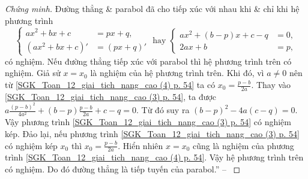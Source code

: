\documentclass[oneside]{book}
\numberwithin{equation}{section}
\begin{document}
\begin{proof}[Chứng minh]
	Đường thẳng \& parabol đã cho tiếp xúc với nhau khi \& chỉ khi hệ phương trình
	\begin{equation}
		\label{SGK_Toan_12_giai_tich_nang_cao (4) p. 54}
		\left\{\begin{split}
			ax^2 + bx + c &= px + q,\\
			(ax^2 + bx + c)' &= (px + q)'
		\end{split}\right.\mbox{ hay }\left\{\begin{split}
			ax^2 + (b - p)x + c - q &= 0,\\
			2ax + b & = p,
		\end{split}\right.
	\end{equation}
	có nghiệm. Nếu đường thẳng tiếp xúc với parabol thì hệ phương trình trên có nghiệm. Giả sử $x = x_0$ là nghiệm của hệ phương trình trên. Khi đó, vì $a\ne 0$ nên từ \eqref{SGK_Toan_12_giai_tich_nang_cao (4) p. 54} ta có $x_0 = \frac{p - b}{2a}$. Thay vào \eqref{SGK_Toan_12_giai_tich_nang_cao (3) p. 54}, ta được $a\frac{(p - b)^2}{4a^2} + (b - p)\frac{p - b}{2a} + c - q = 0$. Từ đó suy ra $(b - p)^2 - 4a(c - q) = 0$. Vậy phương trình \eqref{SGK_Toan_12_giai_tich_nang_cao (3) p. 54} có nghiệm kép. Đảo lại, nếu phương trình \eqref{SGK_Toan_12_giai_tich_nang_cao (3) p. 54} có nghiệm kép $x_0$ thì $x_0 = \frac{p - b}{2a}$. Hiển nhiên $x = x_0$ cũng là nghiệm của phương trình \eqref{SGK_Toan_12_giai_tich_nang_cao (4) p. 54}. Vậy hệ phương trình trên có nghiệm. Do đó đường thẳng là tiếp tuyến của parabol.'' -- \cite[pp. 53--54]{SGK_Toan_12_giai_tich_nang_cao}
\end{proof}
\end{document}
